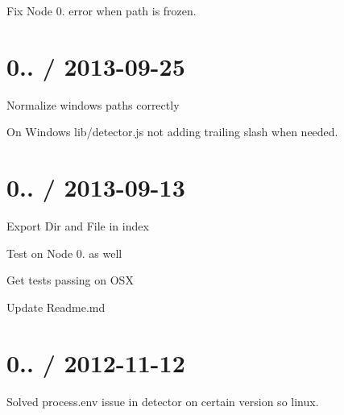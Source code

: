 
\begin{DoxyItemize}
\item Fix Node 0. error when path is frozen.
\end{DoxyItemize}

\section*{0.. / 2013-\/09-\/25 }


\begin{DoxyItemize}
\item Normalize windows paths correctly
\item On Windows lib/detector.\+js not adding trailing slash when needed.
\end{DoxyItemize}

\section*{0.. / 2013-\/09-\/13 }


\begin{DoxyItemize}
\item Export Dir and File in index
\item Test on Node 0. as well
\item Get tests passing on O\+S\+X
\item Update Readme.\+md
\end{DoxyItemize}

\section*{0.. / 2012-\/11-\/12 }


\begin{DoxyItemize}
\item Solved process.\+env issue in detector on certain version so linux. 
\end{DoxyItemize}